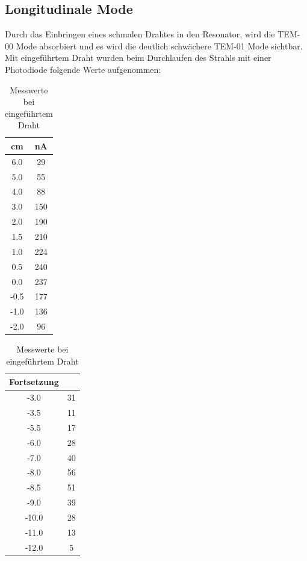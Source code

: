 \subsection{Longitudinale Mode}
Durch das Einbringen eines schmalen Drahtes in den Resonator, wird die TEM-00 Mode absorbiert und es wird die deutlich schwächere TEM-01 Mode sichtbar. Mit eingeführtem Draht wurden beim Durchlaufen des Strahls mit einer Photodiode folgende Werte aufgenommen:

\begin{table}[htbp]
	\begin{minipage}[t]{0.45\textwidth} 
	\begin{tabular}[t]{c|c}
	cm & nA\\ \hline
6.0    & 29 \\
5.0    & 55\\
4.0    & 88\\
3.0    & 150\\
2.0    & 190\\
1.5    & 210\\
1.0    & 224\\
0.5    & 240\\
0.0    & 237\\
-0.5   & 177\\
-1.0   & 136\\
-2.0   & 96\\

	\end{tabular}

	\end{minipage}
	\begin{minipage}[t]{0.45\textwidth} 
	\begin{tabular}[t]{c|c}
	Fortsetzung\\ \hline
-3.0   & 31\\
-3.5   & 11\\
-5.5   & 17\\
-6.0   & 28\\
-7.0   & 40\\
-8.0   & 56\\
-8.5   & 51\\
-9.0   & 39\\
-10.0  & 28\\
-11.0  & 13\\
-12.0  & 5
	\end{tabular}
	\end{minipage}
\caption{Messwerte bei eingeführtem Draht}
\end{table}

